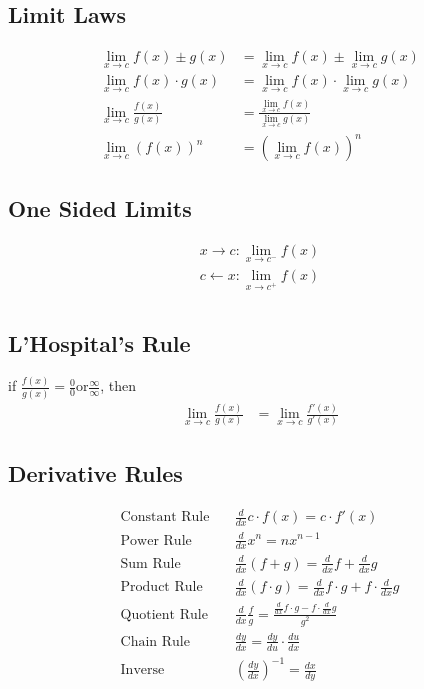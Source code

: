 \documentclass{article}
\begin{document}
\begin{multicols*}{2}

    \subsection*{Limit Laws}
    \begin{align*}
        \lim_{x \to c} f(x) \pm g(x) &= \lim_{x \to c} f(x) \pm \lim_{x \to c} g(x) \\
        \lim_{x \to c} f(x) \cdot g(x) &= \lim_{x \to c} f(x) \cdot \lim_{x \to c} g(x) \\
        \lim_{x \to c} \frac{f(x)}{g(x)} &= \frac{\lim_{x \to c} f(x)}{\lim_{x \to c} g(x)} \\
        \lim_{x \to c} (f(x))^n &= (\lim_{x \to c} f(x))^n
    \end{align*}

    \subsection*{One Sided Limits}
    \begin{align*}
        x \rightarrow c: \lim_{x \to c^-} f(x) \\
        c \leftarrow x: \lim_{x \to c^+} f(x) \\
    \end{align*}

    \subsection*{L'Hospital's Rule}
    if $\frac{f(x)}{g(x)} = \frac{0}{0} \text{or} \frac{\infty}{\infty}$, then
    \begin{align*}
        \lim_{x \to c} \frac{f(x)}{g(x)} &= \lim_{x \to c} \frac{f'(x)}{g'(x)}
    \end{align*}

    \subsection*{Derivative Rules}
    \begin{align*}
        \text{Constant Rule} &\quad \frac{d}{dx} c \cdot f(x) = c \cdot f'(x) \\
        \text{Power Rule} &\quad \frac{d}{dx} x^n = nx^{n-1} \\
        \text{Sum Rule} &\quad \frac{d}{dx} (f+g) = \frac{d}{dx} f + \frac{d}{dx} g \\
        \text{Product Rule} &\quad \frac{d}{dx} (f \cdot g) = \frac{d}{dx} f \cdot g + f \cdot \frac{d}{dx} g \\
        \text{Quotient Rule} &\quad \frac{d}{dx} \frac{f}{g} = \frac{\frac{d}{dx} f \cdot g - f \cdot \frac{d}{dx} g}{g^2} \\
        \text{Chain Rule} &\quad \frac{dy}{dx} = \frac{dy}{du} \cdot \frac{du}{dx} \\
        \text{Inverse} &\quad (\frac{dy}{dx})^{-1} = \frac{dx}{dy} \\
    \end{align*}


\end{multicols*}
\end{document}
